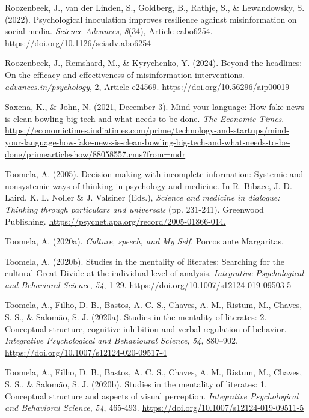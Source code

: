 \documentclass[authordate, reflection]{jote-new-article}
\begin{document}
	Roozenbeek, J., van der Linden, S., Goldberg, B., Rathje, S., \& Lewandowsky, S. (2022). Psychological inoculation improves resilience against misinformation on social media. \emph{Science Advances}, \emph{8}(34), Article eabo6254. \url{https://doi.org/10.1126/sciadv.abo6254}



	Roozenbeek, J., Remshard, M., \& Kyrychenko, Y. (2024). Beyond the headlines: On the efficacy and effectiveness of misinformation interventions. \emph{advances.in/psychology}, 2, Article e24569. \url{https://doi.org/10.56296/aip00019}



	Saxena, K., \& John, N. (2021, December 3). Mind your language: How fake news is clean-bowling big tech and what needs to be done. \emph{The Economic Times}. \url{https://economictimes.indiatimes.com/prime/technology-and-startups/mind-your-language-how-fake-news-is-clean-bowling-big-tech-and-what-needs-to-be-done/primearticleshow/88058557.cms?from=mdr}



	Toomela, A. (2005). Decision making with incomplete information: Systemic and nonsystemic ways of thinking in psychology and medicine. In R. Bibace, J. D. Laird, K. L. Noller \& J. Valsiner (Eds.), \emph{Science and medicine in dialogue: Thinking through particulars and universals} (pp. 231-241). Greenwood Publishing. \url{https://psycnet.apa.org/record/2005-01866-014.}



	Toomela, A. (2020a). \emph{Culture, speech, and My Self. }Porcos ante Margaritas.



	Toomela, A. (2020b). Studies in the mentality of literates: Searching for the cultural Great Divide at the individual level of analysis. \emph{Integrative Psychological and Behavioral Science}, \emph{54}, 1-29. \url{https://doi.org/10.1007/s12124-019-09503-5}



	Toomela, A., Filho, D. B., Bastos, A. C. S., Chaves, A. M., Ristum, M., Chaves, S. S., \& Salomão, S. J. (2020a). Studies in the mentality of literates: 2. Conceptual structure, cognitive inhibition and verbal regulation of behavior. \emph{Integrative Psychological and Behavioural Science}, \emph{54}, 880--902. \url{https://doi.org/10.1007/s12124-020-09517-4}



	Toomela, A., Filho, D. B., Bastos, A. C. S., Chaves, A. M., Ristum, M., Chaves, S. S., \& Salomão, S. J. (2020b). Studies in the mentality of literates: 1. Conceptual structure and aspects of visual perception. \emph{Integrative Psychological and Behavioral Science}, \emph{54}, 465-493. \url{https://doi.org/10.1007/s12124-019-09511-5}
\end{document}
